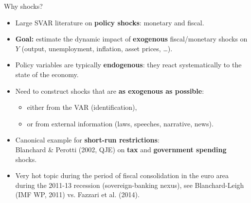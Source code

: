 \documentclass{beamer}
\begin{document}
\begin{frame}{Why shocks?}
\small
\begin{itemize}
  \item Large SVAR literature on \textbf{policy shocks}: monetary and fiscal.
  \item \textbf{Goal:} estimate the dynamic impact of \textbf{exogenous} fiscal/monetary shocks
        on $Y$ (output, unemployment, inflation, asset prices, \dots).
  \item Policy variables are typically \textbf{endogenous}:
        they react systematically to the state of the economy.
  \item Need to construct shocks that are \textbf{as exogenous as possible}:
        \begin{itemize}
          \item either from the VAR (identification),
          \item or from external information (laws, speeches, narrative, news).
        \end{itemize}
  \item Canonical example for \textbf{short-run restrictions}: \\
        Blanchard \& Perotti (2002, QJE) on \textbf{tax} and \textbf{government spending} shocks.
        \item Very hot topic during the period of fiscal consolidation in the euro area during the 2011-13 recession (sovereign-banking nexus), see Blanchard-Leigh (IMF WP, 2011) vs. Fazzari et al. (2014).
\end{itemize}
\end{frame}
\end{document}
